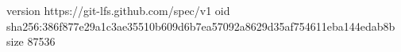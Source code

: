 version https://git-lfs.github.com/spec/v1
oid sha256:386f877e29a1c3ae35510b609d6b7ea57092a8629d35af754611eba144edab8b
size 87536

